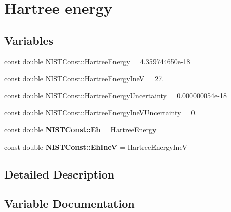 \hypertarget{group___hartree_energy}{}\section{Hartree energy}
\label{group___hartree_energy}
\subsection*{Variables}
\begin{DoxyCompactItemize}
\item 
const double \hyperlink{group___hartree_energy_gab58dc1c4e59e83d4fb1217778fe9f29b}{N\+I\+S\+T\+Const\+::\+Hartree\+Energy} = 4.\+359744650e-\/18
\item 
const double \hyperlink{group___hartree_energy_ga400eb5b8c9b55b0f601870ba54120364}{N\+I\+S\+T\+Const\+::\+Hartree\+Energy\+IneV} = 27.
\item 
const double \hyperlink{group___hartree_energy_gaabdf38a4c491ca0f606bf042c8479801}{N\+I\+S\+T\+Const\+::\+Hartree\+Energy\+Uncertainty} = 0.\+000000054e-\/18
\item 
const double \hyperlink{group___hartree_energy_gaa6e7ae83f510023bdd88d80dae80f97d}{N\+I\+S\+T\+Const\+::\+Hartree\+Energy\+Ine\+V\+Uncertainty} = 0.
\item 
\mbox{\label{group___hartree_energy_ga1955ca3dc0e0714b0caa7304e7389140}} 
const double {\bfseries N\+I\+S\+T\+Const\+::\+Eh} = Hartree\+Energy
\item 
\mbox{\label{group___hartree_energy_ga45991f1895507078b66f94f85e2e8af5}} 
const double {\bfseries N\+I\+S\+T\+Const\+::\+Eh\+IneV} = Hartree\+Energy\+IneV
\end{DoxyCompactItemize}


\subsection{Detailed Description}


\subsection{Variable Documentation}
\mbox{\label{group___hartree_energy_gab58dc1c4e59e83d4fb1217778fe9f29b}} 
